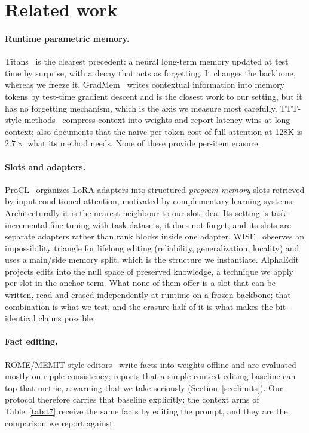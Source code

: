 \documentclass[11pt]{article}
\begin{document}
\section{Related work}
\label{sec:related}

\paragraph{Runtime parametric memory.} Titans~\cite{titans} is the clearest
precedent: a neural long-term memory updated at test time by surprise, with a
decay that acts as forgetting. It changes the backbone, whereas we freeze it.
GradMem~\cite{gradmem} writes contextual information into memory tokens by
test-time gradient descent and is the closest work to our setting, but it has no forgetting mechanism, which is the axis we measure most carefully.
TTT-style methods~\cite{ttt,ttte2e} compress context into weights and report
latency wins at long context; \cite{ttte2e} also documents that the naive
per-token cost of full attention at 128K is $2.7\times$ what its method needs.
None of these provide per-item erasure.

\paragraph{Slots and adapters.} ProCL~\cite{procl} organizes LoRA adapters into
structured \emph{program memory} slots retrieved by input-conditioned attention,
motivated by complementary learning systems. Architecturally it is the nearest neighbour to our slot idea. Its setting is task-incremental fine-tuning with task
datasets, it does not forget, and its slots are separate adapters rather than rank
blocks inside one adapter. WISE~\cite{wise} observes an impossibility triangle for
lifelong editing (reliability, generalization, locality) and uses a main/side
memory split, which is the structure we instantiate. AlphaEdit~\cite{alphaedit}
projects edits into the null space of preserved knowledge, a technique we apply
per slot in the anchor term. What none of them offer is a slot that can be written,
read and erased independently at runtime on a frozen backbone; that combination is
what we test, and the erasure half of it is what makes the bit-identical claims
possible.

\paragraph{Fact editing.} ROME/MEMIT-style editors~\cite{rome,memit} write facts
into weights offline and are evaluated mostly on ripple consistency;
\cite{rippleedits} reports that a simple context-editing baseline can top that
metric, a warning that we take seriously (Section~\ref{sec:limits}). Our protocol
therefore carries that baseline explicitly: the context arms of
Table~\ref{tab:t7} receive the same facts by editing the prompt, and they are the
comparison we report against.
\end{document}
